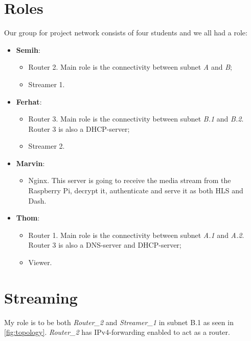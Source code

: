 \documentclass[a4paper,1pt]{article}
\begin{document}
\section{Roles}
Our group for project network consists of four students and we all had a role:
\begin{itemize}
	\item \textbf{Semih}:
	\begin{itemize}
		\item Router 2. Main role is the connectivity between subnet \textit{A} and \textit{B};
		\item Streamer 1.
	\end{itemize}
	\item \textbf{Ferhat}:
	\begin{itemize}
		\item Router 3. Main role is the connectivity between subnet \textit{B.1} and \textit{B.2}. Router 3 is also a DHCP-server;
		\item Streamer 2.
	\end{itemize}
	\item \textbf{Marvin}:
	\begin{itemize}
		\item Nginx. This server is going to receive the media stream from the Raspberry Pi, decrypt it, authenticate and serve it as both HLS and Dash.
	\end{itemize}
	\item \textbf{Thom}:
	\begin{itemize}
		\item Router 1. Main role is the connectivity between subnet \textit{A.1} and \textit{A.2}. Router 3 is also a DNS-server and DHCP-server;
		\item Viewer.
	\end{itemize} 
\end{itemize}
\pagebreak
\section{Streaming}
My role is to be both \textit{Router\_2} and \textit{Streamer\_1} in subnet B.1 as seen in \autoref{fig:topology}. \textit{Router\_2} has IPv4-forwarding enabled to act as a router. 
\end{document}
